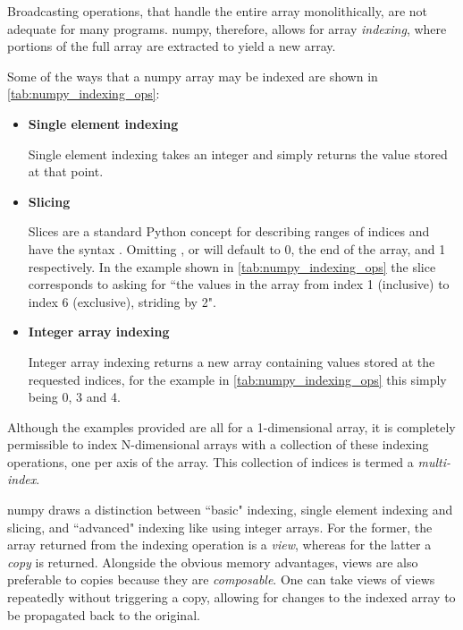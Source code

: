\documentclass[thesis]{subfiles}
\begin{document}
Broadcasting operations, that handle the entire array monolithically, are not adequate for many programs.
numpy, therefore, allows for array \textit{indexing}, where portions of the full array are extracted to yield a new array.

Some of the ways that a numpy array may be indexed are shown in \cref{tab:numpy_indexing_ops}:

\begin{itemize}
  \item \textbf{Single element indexing}

    Single element indexing takes an integer and simply returns the value stored at that point.

  \item \textbf{Slicing}

    Slices are a standard Python concept for describing ranges of indices and have the syntax .
    Omitting ,  or  will default to 0, the end of the array, and 1 respectively.
    In the example shown in \cref{tab:numpy_indexing_ops} the slice \pycode{[1:6:2]} corresponds to asking for ``the values in the array from index 1 (inclusive) to index 6 (exclusive), striding by 2".

  \item \textbf{Integer array indexing}

    Integer array indexing returns a new array containing values stored at the requested indices, for the example in \cref{tab:numpy_indexing_ops} this simply being 0, 3 and 4.

\end{itemize}


Although the examples provided are all for a 1-dimensional array, it is completely permissible to index N-dimensional arrays with a collection of these indexing operations, one per axis of the array.
This collection of indices is termed a \textit{multi-index}.

numpy draws a distinction between ``basic" indexing, single element indexing and slicing, and ``advanced" indexing like using integer arrays.
For the former, the array returned from the indexing operation is a \textit{view}, whereas for the latter a \textit{copy} is returned.
Alongside the obvious memory advantages, views are also preferable to copies because they are \textit{composable}.
One can take views of views repeatedly without triggering a copy, allowing for changes to the indexed array to be propagated back to the original.

\end{document}

